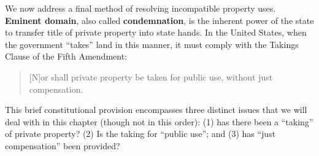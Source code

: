 We now address a final method of resolving incompatible property uses.
\textbf{Eminent domain}, also called \textbf{condemnation},
is the inherent power of the state to transfer title of
private property into state hands. In the United States, when the government
``takes'' land in this manner, it must comply with the Takings Clause of the
Fifth Amendment:
\begin{quote}
[N]or shall private property be taken for public use, without just compensation.
\end{quote}
This
brief constitutional provision encompasses three distinct issues that we will
deal with in this chapter (though not in this order): (1) has there been a
``taking'' of private property? (2) Is the taking for ``public use''; and (3)
has ``just compensation'' been provided?

